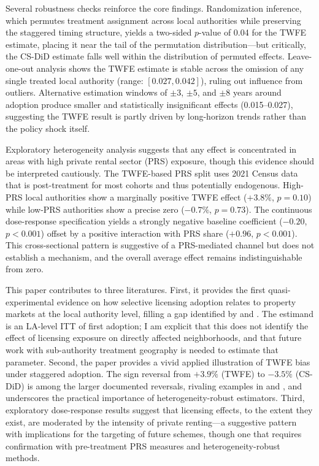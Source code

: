 \documentclass[12pt]{article}
\begin{document}
Several robustness checks reinforce the core findings. Randomization inference, which permutes treatment assignment across local authorities while preserving the staggered timing structure, yields a two-sided $p$-value of 0.04 for the TWFE estimate, placing it near the tail of the permutation distribution---but critically, the CS-DiD estimate falls well within the distribution of permuted effects. Leave-one-out analysis shows the TWFE estimate is stable across the omission of any single treated local authority (range: $[0.027, 0.042]$), ruling out influence from outliers. Alternative estimation windows of $\pm 3$, $\pm 5$, and $\pm 8$ years around adoption produce smaller and statistically insignificant effects (0.015--0.027), suggesting the TWFE result is partly driven by long-horizon trends rather than the policy shock itself.

Exploratory heterogeneity analysis suggests that any effect is concentrated in areas with high private rental sector (PRS) exposure, though this evidence should be interpreted cautiously. The TWFE-based PRS split uses 2021 Census data that is post-treatment for most cohorts and thus potentially endogenous. High-PRS local authorities show a marginally positive TWFE effect ($+3.8\%$, $p = 0.10$) while low-PRS authorities show a precise zero ($-0.7\%$, $p = 0.73$). The continuous dose-response specification yields a strongly negative baseline coefficient ($-0.20$, $p < 0.001$) offset by a positive interaction with PRS share ($+0.96$, $p < 0.001$). This cross-sectional pattern is suggestive of a PRS-mediated channel but does not establish a mechanism, and the overall average effect remains indistinguishable from zero.

This paper contributes to three literatures. First, it provides the first quasi-experimental evidence on how selective licensing adoption relates to property markets at the local authority level, filling a gap identified by \citet{rhodes2006review} and \citet{battenhall2022selective}. The estimand is an LA-level ITT of first adoption; I am explicit that this does not identify the effect of licensing exposure on directly affected neighborhoods, and that future work with sub-authority treatment geography is needed to estimate that parameter. Second, the paper provides a vivid applied illustration of TWFE bias under staggered adoption. The sign reversal from $+3.9\%$ (TWFE) to $-3.5\%$ (CS-DiD) is among the larger documented reversals, rivaling examples in \citet{baker2022much} and \citet{callaway2021difference}, and underscores the practical importance of heterogeneity-robust estimators. Third, exploratory dose-response results suggest that licensing effects, to the extent they exist, are moderated by the intensity of private renting---a suggestive pattern with implications for the targeting of future schemes, though one that requires confirmation with pre-treatment PRS measures and heterogeneity-robust methods.
\end{document}
